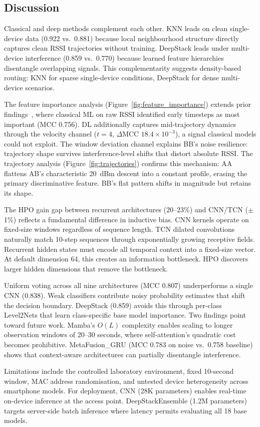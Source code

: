 \subsection{Discussion}

Classical and deep methods complement each other. KNN leads on clean single-device data (0.922 vs.~0.881) because local neighbourhood structure directly captures clean RSSI trajectories without training. DeepStack leads under multi-device interference (0.859 vs.~0.770) because learned feature hierarchies disentangle overlapping signals. This complementarity suggests density-based routing: KNN for sparse single-device conditions, DeepStack for dense multi-device scenarios.

The feature importance analysis (Figure~\ref{fig:feature_importance}) extends prior findings~\cite{ribeiro2026eucnc}, where classical ML on raw RSSI identified early timesteps as most important (MCC 0.756). DL additionally captures mid-trajectory dynamics through the velocity channel ($t=4$, $\Delta$MCC $18.4\times 10^{-3}$), a signal classical models could not exploit. The window deviation channel explains BB's noise resilience: trajectory shape survives interference-level shifts that distort absolute RSSI. The trajectory analysis (Figure~\ref{fig:trajectories}) confirms this mechanism: AA flattens AB's characteristic 20~dBm descent into a constant profile, erasing the primary discriminative feature. BB's flat pattern shifts in magnitude but retains its shape.

The HPO gain gap between recurrent architectures (20--23\%) and CNN/TCN ($\pm$1\%) reflects a fundamental difference in inductive bias. CNN kernels operate on fixed-size windows regardless of sequence length. TCN dilated convolutions naturally match 10-step sequences through exponentially growing receptive fields. Recurrent hidden states must encode all temporal context into a fixed-size vector. At default dimension 64, this creates an information bottleneck. HPO discovers larger hidden dimensions that remove the bottleneck.

Uniform voting across all nine architectures (MCC 0.807) underperforms a single CNN (0.838). Weak classifiers contribute noisy probability estimates that shift the decision boundary. DeepStack (0.859) avoids this through per-class Level2Nets that learn class-specific base model importance. Two findings point toward future work. Mamba's $O(L)$ complexity enables scaling to longer observation windows of 20--30 seconds, where self-attention's quadratic cost becomes prohibitive. MetaFusion\_GRU (MCC 0.783 on noise vs.~0.758 baseline) shows that context-aware architectures can partially disentangle interference.

Limitations include the controlled laboratory environment, fixed 10-second window, MAC address randomisation, and untested device heterogeneity across smartphone models. For deployment, CNN (28K parameters) enables real-time on-device inference at the access point. DeepStackEnsemble (1.2M parameters) targets server-side batch inference where latency permits evaluating all 18 base models.
